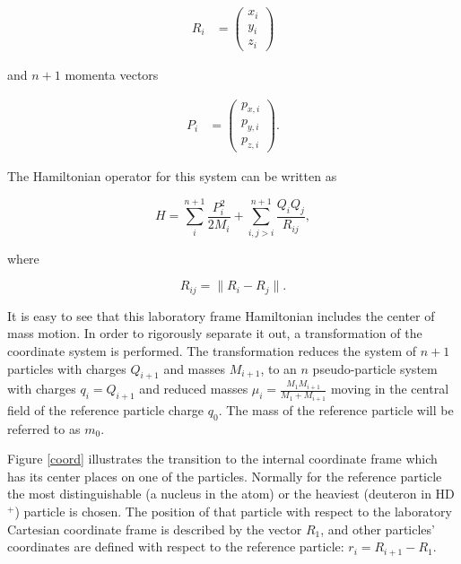 \begin{align}
    R_i &= 
    \begin{pmatrix}
           x_i \\           
           y_i \\
           z_i
    \end{pmatrix}
\end{align}

and $n+1$ momenta vectors

\begin{align}
    P_i &= 
    \begin{pmatrix}
           p_{x,i} \\           
           p_{y,i} \\
           p_{z,i}
    \end{pmatrix}.
\end{align}

The Hamiltonian operator for this system can be written as 

\begin{equation}
H = \sum_i^{n+1} \frac{P_i^2}{2M_i} + \sum_{i,j>i}^{n+1} \frac{Q_i Q_j}{R_{ij}},
\end{equation}

where

\begin{equation}
R_{ij} = \| R_i - R_j \|.
\end{equation}

It is easy to see that this laboratory frame Hamiltonian includes the center
of mass motion. In order to rigorously separate it out, a transformation 
of the coordinate system is performed. The transformation reduces the system
of $n+1$ particles with charges $Q_{i+1}$ and masses $M_{i+1}$, to an 
$n$ pseudo-particle system with charges $q_i = Q_{i+1}$ and reduced masses 
$\mu_i = \frac{M_1 M_{i+1}}{M_1 + M_{i+1}}$ moving in the
central field of the reference particle charge $q_0$. The mass of the
reference particle will be referred to as $m_0$.

Figure \ref{coord} illustrates the transition to the internal coordinate frame which 
has its center places on one of the particles. Normally for the reference particle
the most distinguishable (a nucleus in the atom) or the heaviest (deuteron
in HD$^+$) particle is chosen. The position of that particle with respect to the 
laboratory Cartesian coordinate frame is described by the vector $R_1$,
and other particles' coordinates are defined with respect to the reference particle:
$r_i = R_{i+1} - R_1$.

